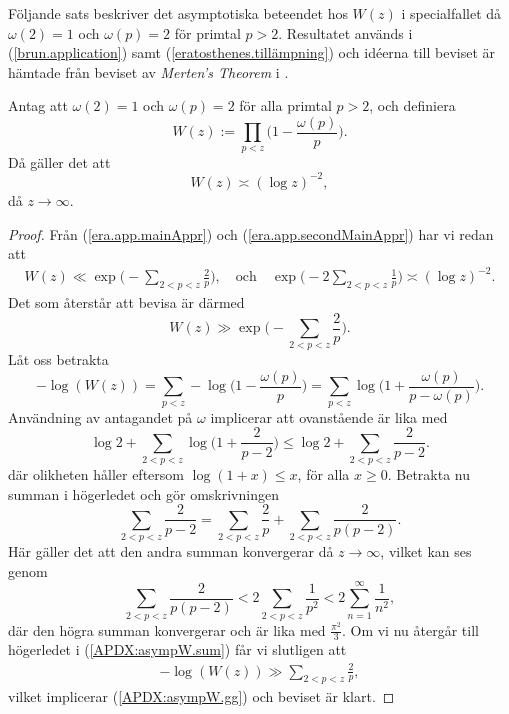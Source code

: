 Följande sats beskriver det asymptotiska beteendet hos $W(z)$ i specialfallet då $\omega(2)=1$ och $\omega(p)=2$ för primtal $p>2$. 
Resultatet används i (\ref{brun.application}) samt (\ref{eratosthenes.tillämpning}) och idéerna till beviset är hämtade från beviset av \textit{Merten's Theorem} i \cite[kap 5.2]{cojocarumurty}.

\begin{theorem} \label{APDX:asympW}
Antag att $\omega(2)=1$ och $\omega(p)=2$ för alla primtal $p>2$, och definiera 
\begin{equation*}
    W(z):=\prod_{p<z}\biggl( 1-\frac{\omega(p)}{p} \biggr).   
\end{equation*}
Då gäller det att
\begin{equation} \label{APDX:asympW.main}
    W(z) \asymp (\log z)^{-2},
\end{equation}
då $z\to\infty$.
\end{theorem}


\begin{proof}
Från (\ref{era.app.mainAppr}) och (\ref{era.app.secondMainAppr}) har vi redan att
\begin{align*}
    W(z) \ll \exp \biggl( - \sum_{2 <p < z} \frac{2}{p}  \biggr),
    \quad\text{och}\quad
    \exp \biggl( - 2 \sum_{2 <p < z} \frac{1}{p}  \biggr) \asymp (\log z)^{-2}.
\end{align*}
Det som återstår att bevisa är därmed
\begin{equation} \label{APDX:asympW.gg}
    W(z) \gg \exp \biggl( - \sum_{2 <p < z} \frac{2}{p}  \biggr).
\end{equation}
Låt oss betrakta
\begin{equation*}
    -\log(W(z)) 
    = \sum_{p < z} -\log\biggl( 1-\frac{\omega(p)}{p} \biggr) 
    = \sum_{p < z} \log\biggl( 1+\frac{\omega(p)}{p-\omega(p)} \biggr).
\end{equation*}
Användning av antagandet på $\omega$ implicerar att ovanstående är lika med 
\begin{equation} \label{APDX:asympW.sum}
    \log 2 + \sum_{2<p<z} \log\biggl( 1+\frac{2}{p-2} \biggr)
    \leq \log 2 + \sum_{2<p<z} \frac{2}{p-2}.
\end{equation}
där olikheten håller eftersom $\log(1+x)\leq x$, för alla $x\geq0$. 
Betrakta nu summan i högerledet och gör omskrivningen
\begin{equation*}
    \sum_{2 <p < z} \frac{2}{p-2} = \sum_{2 <p < z} \frac{2}{p} + \sum_{2 <p < z} \frac{2}{p(p-2)}.
\end{equation*}
Här gäller det att den andra summan konvergerar då $z\to\infty$, vilket kan ses genom
\begin{equation*}
    \sum_{2 <p < z} \frac{2}{p(p-2)} < 2\sum_{2 <p < z} \frac{1}{p^2} < 2\sum_{n = 1}^\infty \frac{1}{n^2},
\end{equation*}
där den högra summan konvergerar och är lika med $\frac{\pi^2}{3}$.
Om vi nu återgår till högerledet i (\ref{APDX:asympW.sum}) får vi slutligen att
\begin{align*}
    -\log(W(z)) \gg \sum_{2 <p < z} \frac{2}{p},
\end{align*}
vilket implicerar (\ref{APDX:asympW.gg}) och beviset är klart.
\end{proof}